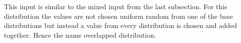 This input is similar to the mixed input from the last subsection.
For this distribution the values are not chosen uniform random from one of the base distributions but instead a value from every distribution is chosen and added together.
Hence the name overlapped distribution.